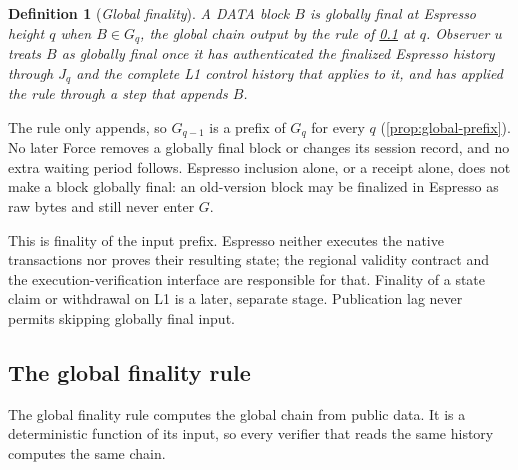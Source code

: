 \documentclass[11pt,a4paper]{article}
\newcommand{\defterm}[1]{\textcolor{rrBlue}{\textit{#1}}}
\newtheorem{definition}{Definition}[section]
\begin{document}
\begin{definition}[\defterm{Global finality}]
\label{def:global-finality}
A DATA block $B$ is \defterm{globally final at Espresso height $q$} when
$B\in G_q$, the global chain output by the rule of \cref{sec:exports} at
$q$. Observer $u$ treats $B$ as globally final once it has authenticated
the finalized Espresso history through $J_q$ and the complete L1 control
history that applies to it, and has applied the rule through a step that
appends $B$.
\end{definition}

The rule only appends, so $G_{q-1}$ is a prefix of $G_q$ for every $q$
(\cref{prop:global-prefix}). No later Force removes a globally final
block or changes its session record, and no extra waiting period
follows. Espresso inclusion alone, or a receipt alone, does not make a
block globally final: an old-version block may be finalized in Espresso
as raw bytes and still never enter $G$.

This is finality of the input prefix. Espresso neither executes the
native transactions nor proves their resulting state; the regional
validity contract and the execution-verification interface are
responsible for that. Finality of a state claim or withdrawal on L1 is a
later, separate stage. Publication lag never permits skipping globally
final input.

\subsection{The global finality rule}
\label{sec:exports}
The global finality rule computes the global chain from public data. It
is a deterministic function of its input, so every verifier that reads
the same history computes the same chain.
\end{document}
